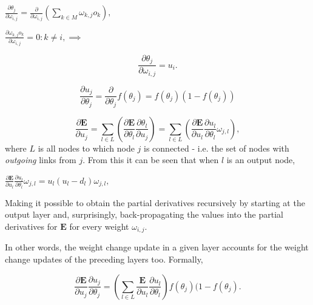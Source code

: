 \begin{center}
\begin{math}
    \frac{\partial \theta_j}{\partial \omega_{i,j}} = \frac{\partial}{\partial \omega_{i,j}}(\sum_{k \in M}{} \omega_{k,j}o_k),
\end{math}
\end{center}

\begin{center}
\begin{math}
    \frac{\partial \omega_{k,j}o_k}{\partial \omega_{i,j}} = 0 : k \neq i,
    \implies
\end{math}
\end{center}
\begin{equation}\label{delta_theta}
    \frac{\partial \theta_j}{\partial \omega_{i,j}} = u_i.
\end{equation}

\begin{equation}
    \frac{\partial u_j}{\partial \theta_j} = \frac{\partial}{\partial \theta_j} f(\theta_j) = f(\theta_j)(1-f(\theta_j))
\end{equation}

\begin{equation}
    \frac{\partial \textbf{E}}{\partial u_j} = \sum_{l \in L}(\frac{\partial \textbf{E}}{\partial \theta_l} 
    \frac{\partial \theta_l}{\partial u_j})
    = \sum_{l \in L}(\frac{\partial \textbf{E}}{\partial u_l} \frac{\partial u_l}{\partial \theta_l} \omega_{j,l}),
\end{equation}
where $L$ is all nodes to which node $j$ is connected - i.e. the set of nodes with \textit{outgoing} links from $j$. From this it can be seen that when $l$ is an output node,

\begin{center}
\begin{math}
    \frac{\partial \textbf{E}}{\partial u_l} \frac{\partial u_l}{\partial \theta_l} \omega_{j,l} = 
    u_l (u_l - d_l) \omega_{j,l},
\end{math}
\end{center}
Making it possible to obtain the partial derivatives recursively by starting at the output layer and, surprisingly, back-propagating the values into the partial derivatives for $\textbf{E}$ for every weight $\omega_{i,j}$.

In other words, the weight change update in a given layer accounts for the weight change updates of the preceding layers too. Formally,

\begin{equation}\label{recursive_derivative_error_activation_input}
    \frac{\partial \textbf{E}}{\partial u_j}\frac{\partial u_j}{\partial \theta_j} = 
    (\sum_{l \in L}\frac{\textbf{E}}{\partial u_l}\frac{\partial u_l}{\partial \theta_l}) f(\theta_j)(1-f(\theta_j).
\end{equation}

